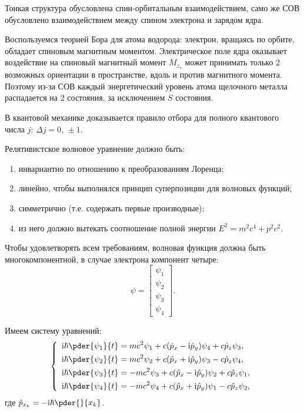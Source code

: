 Тонкая структура обусловлена спин-орбитальным взаимодействием, само же СОВ
обусловлено взаимодействием между спином электрона и зарядом ядра.

Воспользуемся теорией Бора для атома водорода: электрон, вращаясь по орбите,
обладает спиновым магнитным моментом. Электрическое поле ядра оказывает
воздействие на спиновый магнитный момент \( M_{z_s} \) может принимать только 2
возможных ориентации в пространстве, вдоль и против магнитного момента. Поэтому
из-за СОВ каждый энергетический уровень атома щелочного металла распадается на 2
состояния, за исключением \( S \) состояния.

В квантовой механике доказывается правило отбора для полного квантового числа
\( j \): \( \Delta j = 0,\, \pm 1 \).

 
Релятивистское волновое уравнение должно быть:
\begin{enumerate}
    \item инвариантно по отношению к преобразованиям Лоренца;
    \item линейно, чтобы выполнялся принцип суперпозиции для волновых функций;
    \item симметрично (т.е. содержать первые производные);
    \item из него должно вытекать соотношение полной энергии \( E^2 = m^2c^4 +
p^2c^2 \).
\end{enumerate}

Чтобы удовлетворять всем требованиям, волновая функция должна быть
многокомпонентной, в случае электрона компонент четыре:
\[
    \psi = \begin{bmatrix} \psi_1 \\ \psi_2 \\ \psi_3 \\ \psi_4 \end{bmatrix}.
\]

Имеем систему уравнений:
\[
    \left\{ \begin{array}{l}
        \ds \i\hbar\pder{\psi_1}{t} = mc^2\psi_1 + c(\hat{p}_x - \i\hat{p}_y)
        \psi_4 + c\hat{p}_z\psi_3, \\[.4em]
        \ds \i\hbar\pder{\psi_2}{t} = mc^2\psi_2 + c(\hat{p}_x + \i\hat{p}_y)
        \psi_3 - c\hat{p}_z\psi_4, \\[.4em]
        \ds \i\hbar\pder{\psi_3}{t} = -mc^2\psi_3 + c(\hat{p}_x - \i\hat{p}_y)
        \psi_2 + c\hat{p}_z\psi_1, \\[.4em]
        \ds \i\hbar\pder{\psi_4}{t} = -mc^2\psi_4 + c(\hat{p}_x + \i\hat{p}_y)
        \psi_1 - c\hat{p}_z\psi_2,
    \end{array} \right.
\]
где \( \ds \hat{p}_{x_k} = -\i\hbar\pder{}{x_k} \).

